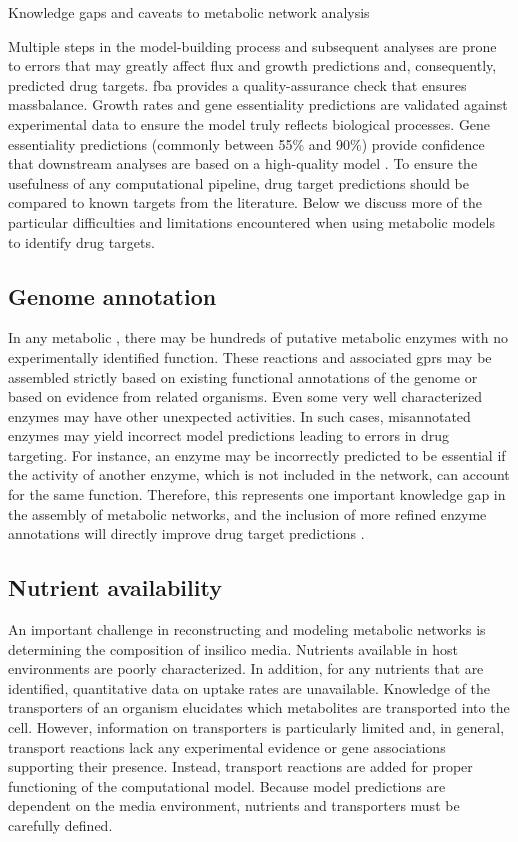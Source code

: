 \begin{pabox}[label=trends:box:caveats,float*=bt,width=\textwidth]{Knowledge gaps and caveats to metabolic network analysis}
\small
\begin{multicols}{2}
Multiple steps in the model-building process and subsequent 
analyses are prone to errors that may greatly affect \gls{flux} 
and growth predictions and, consequently, predicted drug 
targets. \gls{fba} provides a quality-assurance check that ensures 
\gls{massbalance}. Growth rates and gene essentiality predictions 
are validated against experimental data to ensure the 
model truly reflects biological processes. Gene essentiality 
predictions (commonly between 55\% and 90\%) provide 
confidence that downstream analyses are based on a 
high-quality model \cite{Feist:2007dq,Jamshidi:2007ei}. To ensure the usefulness of 
any computational pipeline, drug target predictions 
should be compared to known targets from the literature. 
Below we discuss more of the particular difficulties and 
limitations encountered when using metabolic models to 
identify drug targets.

\subsection*{Genome annotation}
In any metabolic , there may be 
hundreds of putative metabolic enzymes with no 
experimentally identified function. These reactions 
and associated \glspl{gpr} may be assembled 
strictly based on existing functional annotations 
of the genome or based on evidence from related 
organisms. Even some very well characterized enzymes 
may have other unexpected activities. In such cases, 
misannotated enzymes may yield incorrect model 
predictions leading to errors in drug targeting. For 
instance, an enzyme may be incorrectly predicted to be 
essential if the activity of another enzyme, which is 
not included in the network, can account for the same function. 
Therefore, this represents one important knowledge gap in 
the assembly of metabolic networks, and the inclusion of 
more refined enzyme annotations will directly improve 
drug target predictions \cite{Hsiao:2010bu,Szappanos:2011gu}.

\subsection*{Nutrient availability}
An important challenge in reconstructing and modeling 
metabolic networks is determining the composition of 
\gls{insilico} media. Nutrients available in host environments 
are poorly characterized. In addition, for any nutrients 
that are identified, quantitative data on uptake rates 
are unavailable. Knowledge of the transporters of an 
organism elucidates which metabolites are transported 
into the cell. However, information on transporters 
is particularly limited and, in general, transport 
reactions lack any experimental evidence or gene 
associations supporting their presence. Instead, 
transport reactions are added for proper functioning 
of the computational model. Because model predictions are 
dependent on the media environment, nutrients and 
transporters must be carefully defined.


\end{multicols}
\end{pabox}
